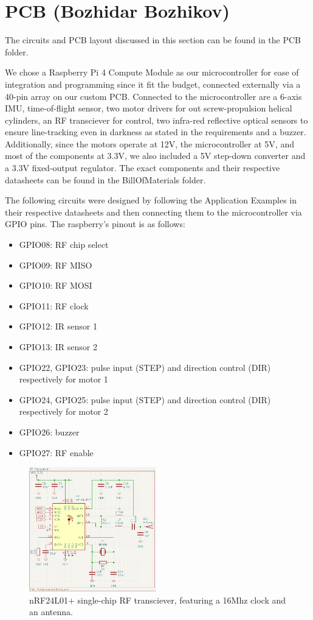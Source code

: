 \documentclass[12pt,a4paper,english]{article}
\begin{document}
\section{PCB (Bozhidar Bozhikov)}

The circuits and PCB layout discussed in this section can be found in the PCB folder.

We chose a Raspberry Pi 4 Compute Module as our microcontroller for ease of integration and programming since it fit the budget, connected externally via a 40-pin array on our custom PCB. Connected to the microcontroller are a 6-axis IMU, time-of-flight sensor, two motor drivers for out screw-propulsion helical cylinders, an RF transciever for control, two infra-red reflective optical sensors to ensure line-tracking even in darkness as stated in the requirements and a buzzer. Additionally, since the motors operate at 12V, the microcontroller at 5V, and most of the components at 3.3V, we also included a 5V step-down converter and a 3.3V fixed-output regulator. The exact components and their respective datasheets can be found in the BillOfMaterials folder. 

The following circuits were designed by following the Application Examples in their respective datasheets and then connecting them to the microcontroller via GPIO pins. The raspberry's pinout is as follows:

\begin{itemize}
    \item GPIO08: RF chip select
    \item GPIO09: RF MISO
    \item GPIO10: RF MOSI
    \item GPIO11: RF clock
    \item GPIO12: IR sensor 1
    \item GPIO13: IR sensor 2
    \item GPIO22, GPIO23: pulse input (STEP) and direction control (DIR) respectively for motor 1
    \item GPIO24, GPIO25: pulse input (STEP) and direction control (DIR) respectively for motor 2
    \item GPIO26: buzzer
    \item GPIO27: RF enable

\end{itemize}

\begin{figure}[!ht]
  \begin{center}
    \includegraphics[width=5.5cm]{./Figures/rf.png}
    \caption{nRF24L01+ single-chip RF transciever, featuring a 16Mhz clock and an antenna.}
  \end{center}
\end{figure}
\end{document}
